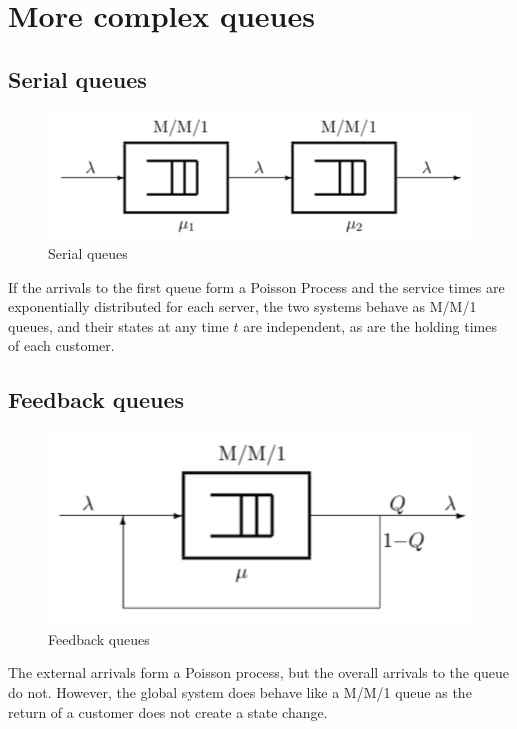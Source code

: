 \documentclass[12pt, openany]{report}
\theoremstyle{definition}
\begin{document}
\section{More complex queues}
\subsection{Serial queues}
\begin{figure}[H]
	\centering 
	\includegraphics[width=.8\textwidth]{img/serial_queues.png}
	\caption{Serial queues}
	\label{fig:serial_queues}
\end{figure}
If the arrivals to the first queue form a Poisson Process and the service times are exponentially distributed for each server, the two systems behave as M/M/1 queues, and their states at any time $t$ are independent, as are the holding times of each customer. 
\subsection{Feedback queues}
\begin{figure}[H]
	\centering 
	\includegraphics[width=.8\textwidth]{img/feedback_queue.png}
	\caption{Feedback queues}
	\label{fig:feedback_queues}
\end{figure}
The external arrivals form a Poisson process, but the overall arrivals to the queue do not. However, the global system does behave like a M/M/1 queue as the return of a customer does not create a state change.
\end{document}
